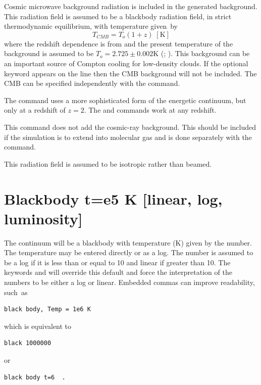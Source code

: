 Cosmic microwave background radiation is included in the generated
background.
This radiation field is assumed to be a blackbody radiation
field, in strict thermodynamic equilibrium, with temperature given~by
\begin{equation}
T_{CMB}  = T_o \left( {1 + z} \right)\; [\mathrm{K}]%
\end{equation}
where the redshift dependence is from \citet{Peebles1971} and the present
temperature of the background is assumed to be $T_o = 2.725 \pm 0.002$K
(\citealp{Mather1999}; \citealp{Wilkinson1987}).
This background can be an important source
of Compton cooling for low-density clouds.
If the optional keyword
appears on the line then the CMB background will not be included.
The CMB can be specified independently with
the  command.

The  command uses a more sophisticated
form of the energetic continuum, but only at a redshift of $z = 2$.
The  and 
commands work at any redshift.

This command does not add the cosmic-ray background.
This should be
included if the simulation is to extend into molecular gas and is done
separately with the  command.

This radiation field is assumed to be isotropic rather than beamed.

\section{Blackbody t=e5 K [linear, log, luminosity]}

The continuum will be a blackbody with temperature (K) given by the
number.
The temperature may be entered directly or as a log.
The number
is assumed to be a log if it is less than or equal to 10 and linear if
greater than 10.
The keywords  and  will override
this default
and force the interpretation of the numbers to be either a log or linear.
Embedded commas can improve readability, such~as
\begin{verbatim}
black body, Temp = 1e6 K
\end{verbatim}
which is equivalent to
\begin{verbatim}
black 1000000
\end{verbatim}
or
\begin{verbatim}
black body t=6  .
\end{verbatim}

